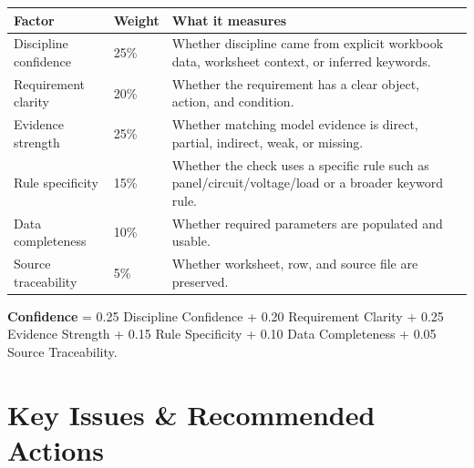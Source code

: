 \documentclass[10pt,letterpaper]{article}
\newcommand{\strong}[1]{\textbf{\textcolor{emaNavy}{#1}}}
\begin{document}
\begin{tcolorbox}
\begin{tabularx}{\textwidth}{p{1.55in}p{0.75in}X}
\toprule
\textbf{Factor} & \textbf{Weight} & \textbf{What it measures} \\
\midrule
Discipline confidence & 25\% & Whether discipline came from explicit workbook data, worksheet context, or inferred keywords. \\
Requirement clarity & 20\% & Whether the requirement has a clear object, action, and condition. \\
Evidence strength & 25\% & Whether matching model evidence is direct, partial, indirect, weak, or missing. \\
Rule specificity & 15\% & Whether the check uses a specific rule such as panel/circuit/voltage/load or a broader keyword rule. \\
Data completeness & 10\% & Whether required parameters are populated and usable. \\
Source traceability & 5\% & Whether worksheet, row, and source file are preserved. \\
\bottomrule
\end{tabularx}
\end{tcolorbox}

\begin{tcolorbox}[colback=emaSoft]
\strong{Confidence} = 0.25 Discipline Confidence + 0.20 Requirement Clarity + 0.25 Evidence Strength + 0.15 Rule Specificity + 0.10 Data Completeness + 0.05 Source Traceability.
\end{tcolorbox}

\section*{Key Issues \& Recommended Actions}
\end{document}
